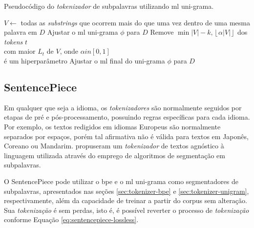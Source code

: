 \begin{algorithm}
    \caption{Pseudocódigo do \textit{tokenizador} de subpalavras utilizando \gls{ml} uni-grama.}
    $V \gets$ todas as \textit{substrings} que ocorrem mais do que uma vez dentro de uma mesma palavra em $D$\;
     {
        Ajustar o \gls{ml} uni-grama $\phi$ para $D$\;
        Remove $\min{|V| - k,\left \lfloor{\alpha|V|}\right \rfloor}$ dos \textit{tokens} $t$\\
        com maior $L_t$ de $V$, onde $\alpha in [0,1]$\\
        é um hiperparâmetro\;
    }
    Ajustar o \gls{ml} final do uni-grama $\phi$ para $D$
    \label{alg:unigram-algorithm}
\end{algorithm}

\subsection{SentencePiece}
\label{sec:tokenizer-sentencepiece}

Em qualquer que seja a idioma, os \textit{tokenizadores} são normalmente seguidos por etapas de pré e pós-processamento, possuindo regras específicas para cada idioma. Por exemplo, os textos redigidos em idiomas Europeus são normalmente separados por espaços, porém tal afirmativa não é válida para textos em Japonês, Coreano ou Mandarim. \textcite{Kudo2018SentencePiece} propuseram um \textit{tokenizador} de textos agnóstico à linguagem utilizada através do emprego de algoritmos de segmentação em subpalavras.

O SentencePiece pode utilizar o \gls{bpe} e o \gls{ml} uni-grama como segmentadores de subpalavras, apresentados nas seções \ref{sec:tokenizer-bpe} e \ref{sec:tokenizer-unigram}, respectivamente, além da capacidade de treinar a partir do corpus sem alteração. Sua \textit{tokenização} é sem perdas, isto é, é possível reverter o processo de \textit{tokenização} conforme Equação \ref{eq:sentencepiece-lossless}.

